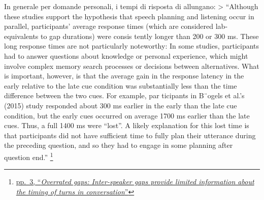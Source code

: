 \documentclass[
]{article}
\begin{document}
In generale per domande personali, i tempi di risposta di allungano: \textgreater{} ``Although these studies support the hypothesis that speech planning and listening occur in parallel, participants' average response times (which are considered lab-equivalents to gap durations) were consis­ tently longer than 200 or 300 ms. These long response times are not particularly noteworthy: In some studies, participants had to answer questions about knowledge or personal experience, which might involve complex memory search processes or decisions between alternatives. What is important, however, is that the average gain in the response latency in the early relative to the late cue condition was substantially less than the time difference between the two cues. For example, par­ ticipants in B¨ogels et al.'s (2015) study responded about 300 ms earlier in the early than the late cue condition, but the early cues occurred on average 1700 ms earlier than the late cues. Thus, a full 1400 ms were ``lost''. A likely explanation for this lost time is that participants did not have sufficient time to fully plan their utterance during the preceding question, and so they had to engage in some planning after question end.'' \footnote{\href{DOC/1-s2.0-S0010027722000257-main.pdf}{pp.~3, ``\emph{Overrated gaps: Inter-speaker gaps provide limited information about the timing of turns in conversation}''}}
\end{document}

